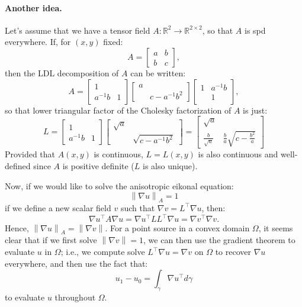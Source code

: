 \documentclass[12pt]{article}
\newcommand{\norm}[1]{\left\|#1\right\|}
\begin{document}
\paragraph{Another idea.} Let's assume that we have a tensor field
$A : \mathbb{R}^2 \to \mathbb{R}^{2 \times 2}$, so that $A$ is spd
everywhere. If, for $(x, y)$ fixed:
\begin{equation}
  A = \begin{bmatrix}
    a & b \\ b & c
  \end{bmatrix},
\end{equation}
then the LDL decomposition of $A$ can be written:
\begin{equation}
  A = \begin{bmatrix}
    1 & \\ a^{-1}b & 1
  \end{bmatrix} \begin{bmatrix}
    a & \\ & c - a^{-1} b^2
  \end{bmatrix} \begin{bmatrix}
    1 & a^{-1} b \\ & 1
  \end{bmatrix},
\end{equation}
so that lower triangular factor of the Cholesky factorization of $A$
is just:
\begin{equation}
  L = \begin{bmatrix}
    1 & \\ a^{-1} b & 1
  \end{bmatrix} \begin{bmatrix}
    \sqrt{a} & \\ & \sqrt{c - a^{-1}b^2}
  \end{bmatrix} = \begin{bmatrix}
    \sqrt{a} & \\ \frac{b}{\sqrt{a}} & \frac{b}{a} \sqrt{c - \frac{b^2}{a}}
  \end{bmatrix}
\end{equation}
Provided that $A(x, y)$ is continuous, $L = L(x, y)$ is also
continuous and well-defined since $A$ is positive definite ($L$ is
also unique).

Now, if we would like to solve the anisotropic eikonal equation:
\begin{equation}
  \norm{\nabla u}_A = 1
\end{equation}
if we define a new scalar field $v$ such that
$\nabla v = L^\top \nabla u$, then:
\begin{equation}
  \nabla u^\top A \nabla u = \nabla u^\top L L^\top \nabla u = \nabla v^\top \nabla v.
\end{equation}
Hence, $\norm{\nabla u}_A = \norm{\nabla v}$. For a point source in a
convex domain $\Omega$, it seems clear that if we first solve
$\norm{\nabla v} = 1$, we can then use the gradient theorem to
evaluate $u$ in $\Omega$; i.e., we compute solve
$L^\top \nabla u = \nabla v$ on $\Omega$ to recover $\nabla u$
everywhere, and then use the fact that:
\begin{equation}
  u_1 - u_0 = \int_\gamma \nabla u^\top d\gamma
\end{equation}
to evaluate $u$ throughout $\Omega$.
\end{document}
